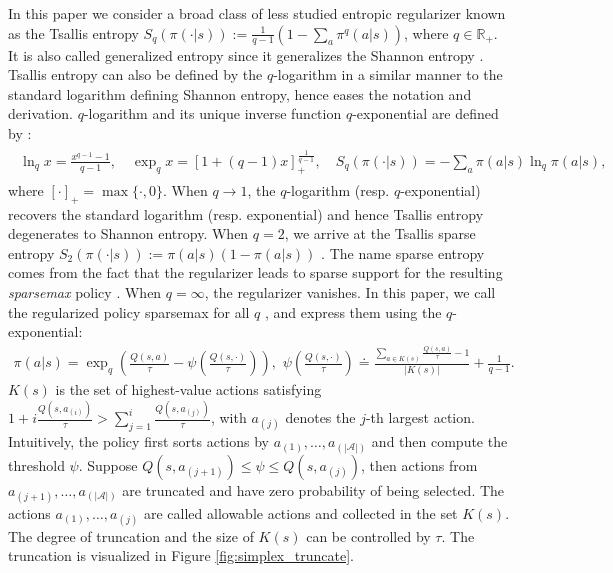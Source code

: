 \documentclass{article}
\newcommand{\AdaBracket}[1]{\left(#1\right)}
\newcommand{\AdaRectBracket}[1]{\left[#1\right]}
\newcommand{\qlog}{$q$-logarithm }
\newcommand{\tsallis}[1]{S_q(#1)}
\newcommand{\logq}[1]{\ln_{q}\!#1}
\newcommand{\expq}[1]{\exp_{q}\!#1}
\begin{document}
In this paper we consider a broad class of less studied entropic regularizer known as the Tsallis entropy $S_q(\pi(\cdot|s)):= \frac{1}{q-1} \AdaBracket{1-\sum_a \pi^q(a|s)}$, where $q \in \mathbb{R}_{+}$.
It is also called generalized entropy since it generalizes the Shannon entropy \cite{TsallisEntropy,tsallis2009introduction}.
Tsallis entropy can also be defined by the \qlog in a similar manner to the standard logarithm defining Shannon entropy, hence eases the notation and derivation.
\qlog and its unique inverse function $q$-exponential are defined by \cite{tsallis2009introduction}:
\begin{align}
    \begin{split}
        \logq{x} = \frac{x^{q-1} - 1}{q-1}, \quad \expq{x} = \AdaRectBracket{1 + (q - 1)x}^{\frac{1}{q-1}}_{+}, \quad \tsallis{\pi(\cdot|s)} = -\sum_{a}{\pi(a|s)}{\logq{\pi(a|s)}},
    \end{split}
\end{align}
where $[\cdot]_{+} = \max \{\cdot, 0\}$.
When $q\rightarrow 1$, the \qlog (resp. $q$-exponential) recovers the standard logarithm (resp. exponential) and hence Tsallis entropy degenerates to Shannon entropy.
When $q=2$, we arrive at the Tsallis sparse entropy 
$S_2(\pi(\cdot | s)):= \pi(a|s)\AdaBracket{1 - \pi(a|s)}$ \cite{Nachum18a-tsallis,Lee2018-TsallisRAL}. 
The name sparse entropy comes from the fact that the regularizer leads to sparse support for the resulting \emph{sparsemax} policy \cite{Blondel-2020LearningFenchelYoundLoss,Martins16-sparsemax}.
When $q=\infty$, the regularizer vanishes.
In this paper, we call the regularized policy sparsemax for all $q$ , and express them using the $q$-exponential\footnotemark{}:
\begin{align}
    \pi(a|s) = \exp_q \AdaBracket{\frac{Q(s,a)}{\tau } - {\psi}\AdaBracket{\frac{Q(s, \cdot)}{\tau }}}, \,\,
    {\psi}\AdaBracket{\frac{Q(s,\cdot)}{\tau}} \doteq \frac{\sum_{a\in K(s)} \frac{Q(s,a)}{\tau} - 1 }{|K{(s)}|} + \frac{1}{q-1}.
    \label{eq:tsallis_policy}
\end{align}
  $K(s)$ is the set of highest-value actions satisfying $1 \!+\! i\frac{Q(s,a_{(i)})}{\tau} \!>\! \sum_{j=1}^{i}\frac{Q(s,a_{(j)})}{\tau}$, with $a_{(j)}$ denotes the $j$-th largest action.
  Intuitively, the policy first sorts actions by $a_{(1)}, \dots, a_{(|\mathcal{A}|)}$ and then compute the threshold $\psi$.
  Suppose $Q(s, a_{(j+1)}) \leq \psi \leq Q(s, a_{(j)})$, then actions from $a_{(j+1)}, \dots, a_{(|\mathcal{A}|)}$ are truncated and have zero probability of being selected.
  The actions $a_{(1)}, \dots, a_{(j)}$ are called allowable actions and collected in the set $K(s)$.
  The degree of truncation and the size of $K(s)$ can be controlled by $\tau$. The truncation is visualized in Figure \ref{fig:simplex_truncate}.
  
\end{document}
